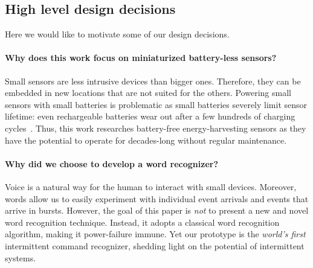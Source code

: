 \subsection{High level design decisions}
Here we would like to motivate some of our design decisions.

\paragraph{Why does this work focus on miniaturized battery-less sensors?}
Small sensors are less intrusive devices than bigger ones. Therefore, they can be embedded in new locations that are not suited for the others. Powering small sensors with small batteries is problematic as small batteries severely limit sensor lifetime: even rechargeable batteries wear out after a few hundreds of charging cycles~\cite{aditya2008comparison}.  Thus, this work researches battery-free energy-harvesting sensors as they have the potential to operate for decades-long without regular maintenance.

\paragraph{Why did we choose to develop a word recognizer?}
Voice is a natural way for the human to interact with small devices. Moreover, words allow us to easily experiment with individual event arrivals and events that arrive in bursts. 
However, the goal of this paper is \emph{not} to present a new and novel word recognition technique. 
Instead, it adopts a classical word recognition algorithm, making it power-failure immune. Yet our \cim prototype is the \emph{world's first} intermittent command recognizer, shedding light on the potential of intermittent systems. 





















